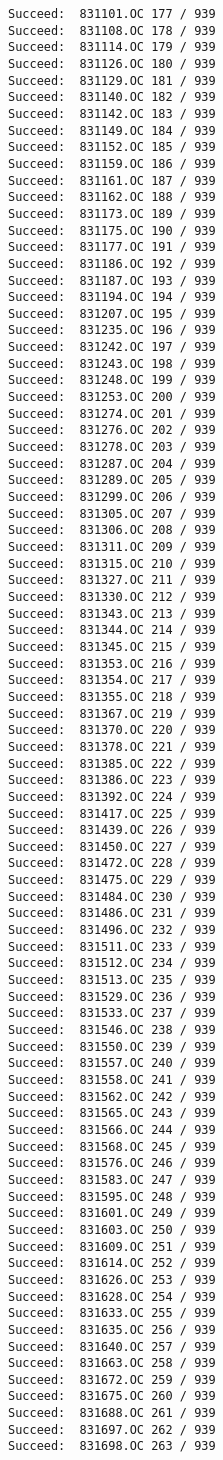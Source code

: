 \documentclass[11pt]{article}
\begin{document}
\begin{verbatim}
Succeed:  831101.OC 177 / 939
Succeed:  831108.OC 178 / 939
Succeed:  831114.OC 179 / 939
Succeed:  831126.OC 180 / 939
Succeed:  831129.OC 181 / 939
Succeed:  831140.OC 182 / 939
Succeed:  831142.OC 183 / 939
Succeed:  831149.OC 184 / 939
Succeed:  831152.OC 185 / 939
Succeed:  831159.OC 186 / 939
Succeed:  831161.OC 187 / 939
Succeed:  831162.OC 188 / 939
Succeed:  831173.OC 189 / 939
Succeed:  831175.OC 190 / 939
Succeed:  831177.OC 191 / 939
Succeed:  831186.OC 192 / 939
Succeed:  831187.OC 193 / 939
Succeed:  831194.OC 194 / 939
Succeed:  831207.OC 195 / 939
Succeed:  831235.OC 196 / 939
Succeed:  831242.OC 197 / 939
Succeed:  831243.OC 198 / 939
Succeed:  831248.OC 199 / 939
Succeed:  831253.OC 200 / 939
Succeed:  831274.OC 201 / 939
Succeed:  831276.OC 202 / 939
Succeed:  831278.OC 203 / 939
Succeed:  831287.OC 204 / 939
Succeed:  831289.OC 205 / 939
Succeed:  831299.OC 206 / 939
Succeed:  831305.OC 207 / 939
Succeed:  831306.OC 208 / 939
Succeed:  831311.OC 209 / 939
Succeed:  831315.OC 210 / 939
Succeed:  831327.OC 211 / 939
Succeed:  831330.OC 212 / 939
Succeed:  831343.OC 213 / 939
Succeed:  831344.OC 214 / 939
Succeed:  831345.OC 215 / 939
Succeed:  831353.OC 216 / 939
Succeed:  831354.OC 217 / 939
Succeed:  831355.OC 218 / 939
Succeed:  831367.OC 219 / 939
Succeed:  831370.OC 220 / 939
Succeed:  831378.OC 221 / 939
Succeed:  831385.OC 222 / 939
Succeed:  831386.OC 223 / 939
Succeed:  831392.OC 224 / 939
Succeed:  831417.OC 225 / 939
Succeed:  831439.OC 226 / 939
Succeed:  831450.OC 227 / 939
Succeed:  831472.OC 228 / 939
Succeed:  831475.OC 229 / 939
Succeed:  831484.OC 230 / 939
Succeed:  831486.OC 231 / 939
Succeed:  831496.OC 232 / 939
Succeed:  831511.OC 233 / 939
Succeed:  831512.OC 234 / 939
Succeed:  831513.OC 235 / 939
Succeed:  831529.OC 236 / 939
Succeed:  831533.OC 237 / 939
Succeed:  831546.OC 238 / 939
Succeed:  831550.OC 239 / 939
Succeed:  831557.OC 240 / 939
Succeed:  831558.OC 241 / 939
Succeed:  831562.OC 242 / 939
Succeed:  831565.OC 243 / 939
Succeed:  831566.OC 244 / 939
Succeed:  831568.OC 245 / 939
Succeed:  831576.OC 246 / 939
Succeed:  831583.OC 247 / 939
Succeed:  831595.OC 248 / 939
Succeed:  831601.OC 249 / 939
Succeed:  831603.OC 250 / 939
Succeed:  831609.OC 251 / 939
Succeed:  831614.OC 252 / 939
Succeed:  831626.OC 253 / 939
Succeed:  831628.OC 254 / 939
Succeed:  831633.OC 255 / 939
Succeed:  831635.OC 256 / 939
Succeed:  831640.OC 257 / 939
Succeed:  831663.OC 258 / 939
Succeed:  831672.OC 259 / 939
Succeed:  831675.OC 260 / 939
Succeed:  831688.OC 261 / 939
Succeed:  831697.OC 262 / 939
Succeed:  831698.OC 263 / 939

\end{verbatim}
\end{document}
